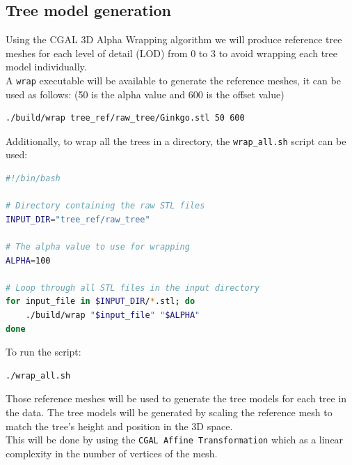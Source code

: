 \documentclass[12pt]{article}
\begin{document}
\subsection{Tree model generation}
Using the CGAL 3D Alpha Wrapping \cite{cgal_alpha_wrapper} algorithm we will produce
reference tree meshes for each level of detail (LOD) from 0 to 3 to avoid wrapping
each tree model individually. \\

A \texttt{wrap} executable will be available to generate the reference meshes, it
can be used as follows:
(50 is the alpha value and 600 is the offset value)

\begin{lstlisting}[language=bash]
./build/wrap tree_ref/raw_tree/Ginkgo.stl 50 600
\end{lstlisting}


Additionally, to wrap all the trees in a directory, the \texttt{wrap\_all.sh} script
can be used:

\begin{lstlisting}[language=bash]
#!/bin/bash

# Directory containing the raw STL files
INPUT_DIR="tree_ref/raw_tree"

# The alpha value to use for wrapping
ALPHA=100

# Loop through all STL files in the input directory
for input_file in $INPUT_DIR/*.stl; do
	./build/wrap "$input_file" "$ALPHA"
done
\end{lstlisting}

To run the script:
\begin{lstlisting}
./wrap_all.sh
\end{lstlisting}

   Those reference meshes will be used to generate the tree models for each tree
in the data. The tree models will be generated by scaling the reference mesh
to match the tree's height and position in the 3D space. \\
This will be done by using the \texttt{CGAL Affine Transformation} \cite{cgal_affine_transformation}
which as a linear complexity in the number of vertices of the mesh.
\end{document}
